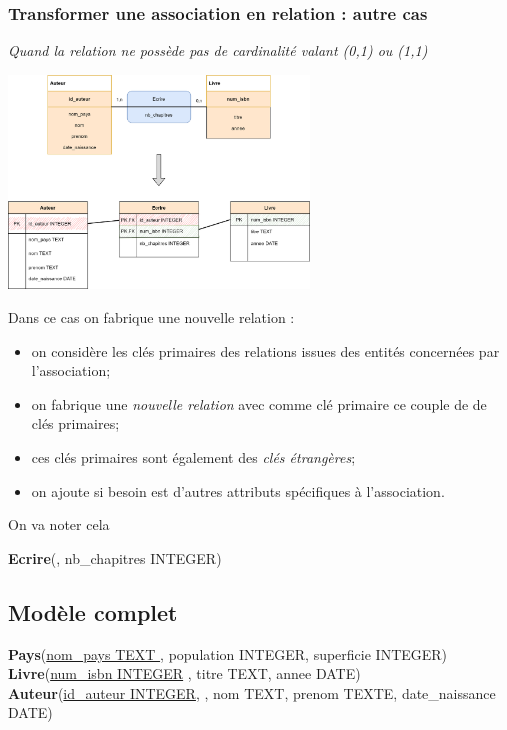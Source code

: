 \documentclass[10pt,cours,a4paper,firamath]{nsi}
\begin{document}
\subsubsection{Transformer une association en relation : autre cas}
\textit{Quand la relation ne possède pas de cardinalité valant (0,1) ou (1,1)}
\begin{center}
	\includegraphics[width=8cm]{img/association_vers_relation_2}
\end{center}

Dans ce cas on fabrique une nouvelle relation :
\begin{itemize}
	\item on considère les clés primaires des relations issues des entités concernées par l'association;
	\item on fabrique une \textit{nouvelle relation} avec comme clé primaire ce couple de de clés primaires;
	\item ces clés primaires sont également des \textit{clés étrangères};
	\item on ajoute si besoin est d'autres attributs spécifiques à l'association.
\end{itemize}
On va noter cela

\textbf{Ecrire}(\uline{}, nb\_chapitres INTEGER)\\

\subsection{Modèle complet}


\textbf{Pays}(\uline{nom\_pays TEXT }, population INTEGER, superficie INTEGER)\\

\textbf{Livre}(\uline{num\_isbn INTEGER} , titre TEXT, annee DATE)\\

{\scriptsize\textbf{Auteur}(\uline{id\_auteur INTEGER},  , nom TEXT, prenom TEXTE, date\_naissance DATE)\\}
\end{document}
